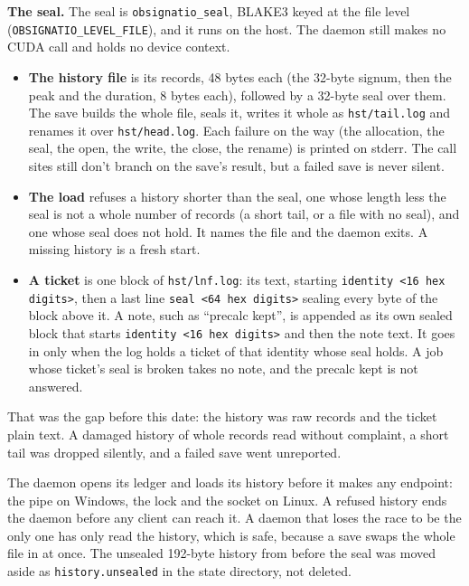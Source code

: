 \textbf{The seal.} The seal is \texttt{obsignatio\_\allowbreak{}seal}, BLAKE3 keyed at the file level (\texttt{OBSIGNATIO\_\allowbreak{}LEVEL\_\allowbreak{}FILE}), and it runs on the host. The daemon still makes no CUDA call and holds no device context.

\begin{itemize}
\item \textbf{The history file} is its records, 48 bytes each (the 32-byte signum, then the peak and the duration, 8 bytes each), followed by a 32-byte seal over them. The save builds the whole file, seals it, writes it whole as \texttt{hst/\allowbreak{}tail.\allowbreak{}log} and renames it over \texttt{hst/\allowbreak{}head.\allowbreak{}log}. Each failure on the way (the allocation, the seal, the open, the write, the close, the rename) is printed on stderr. The call sites still don't branch on the save's result, but a failed save is never silent.
\item \textbf{The load} refuses a history shorter than the seal, one whose length less the seal is not a whole number of records (a short tail, or a file with no seal), and one whose seal does not hold. It names the file and the daemon exits. A missing history is a fresh start.
\item \textbf{A ticket} is one block of \texttt{hst/\allowbreak{}lnf.\allowbreak{}log}: its text, starting \texttt{identity <16 hex digits>}, then a last line \texttt{seal <64 hex digits>} sealing every byte of the block above it. A note, such as “precalc kept”, is appended as its own sealed block that starts \texttt{identity <16 hex digits>} and then the note text. It goes in only when the log holds a ticket of that identity whose seal holds. A job whose ticket's seal is broken takes no note, and the precalc kept is not answered.
\end{itemize}

That was the gap before this date: the history was raw records and the ticket plain text. A damaged history of whole records read without complaint, a short tail was dropped silently, and a failed save went unreported.

The daemon opens its ledger and loads its history before it makes any endpoint: the pipe on Windows, the lock and the socket on Linux. A refused history ends the daemon before any client can reach it. A daemon that loses the race to be the only one has only read the history, which is safe, because a save swaps the whole file in at once. The unsealed 192-byte history from before the seal was moved aside as \texttt{history.\allowbreak{}unsealed} in the state directory, not deleted.


